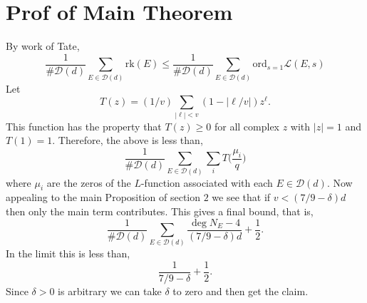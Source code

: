 \documentclass[12pt,reqno]{amsart}
\begin{document}
\section{Prof of Main Theorem}

By work of Tate, 
$$
\frac{1}{\#\mathcal{D}(d)} \sum_{E \in \mathcal{D}(d)} \text{rk}(E) \leq \frac{1}{\# \mathcal{D}(d)} \sum_{E \in \mathcal{D}(d)} \text{ord}_{s = 1} \mathcal{L}(E, s)
$$
Let $$
T(z) = (1 / v) \sum_{|\ell| < v} (1 - |\ell / v|) z^{\ell}.
$$ 
This function has the property that $T(z) \geq 0$ for all complex $z$ with $|z| = 1$ and $T(1) = 1$. Therefore, the above is less than,
$$
\frac{1}{\#\mathcal{D}(d)} \sum_{E \in \mathcal{D}(d)} \sum_{i} T \Big ( \frac{\mu_i}{q} \Big )
$$
where $\mu_i$ are the zeros of the $L$-function associated with each $E \in \mathcal{D}(d)$.
Now appealing to the main Proposition of section $2$ we see that if $v < (7/9 - \delta) d$ then only the main term contributes. This gives a final bound, that is,
$$
\frac{1}{\# \mathcal{D}(d)} \sum_{E \in \mathcal{D}(d)} \frac{\deg N_E - 4}{(7 / 9 - \delta) d} + \frac{1}{2}.
$$
In the limit this is less than, 
$$
\frac{1}{7 / 9 - \delta} + \frac{1}{2}.
$$
Since $\delta > 0$ is arbitrary we can take $\delta$ to zero and then get the claim. 


\printbibliography
\end{document}
